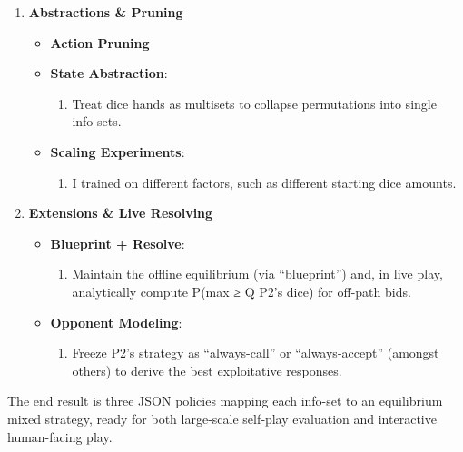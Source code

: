 \documentclass[
]{article}
\begin{document}
\begin{enumerate}
\def\labelenumi{\arabic{enumi}.}
\setcounter{enumi}{4}
\item
  \textbf{Abstractions \& Pruning}

  \begin{itemize}
  \item
    \textbf{Action Pruning}
  \item
    \textbf{State Abstraction}:

    \begin{enumerate}
    \def\labelenumii{\arabic{enumii}.}
    \item
      Treat dice hands as multisets to collapse permutations into single
      info-sets.
    \end{enumerate}
  \item
    \textbf{Scaling Experiments}:

    \begin{enumerate}
    \def\labelenumii{\arabic{enumii}.}
    \item
      I trained on different factors, such as different starting dice
      amounts.
    \end{enumerate}
  \end{itemize}
\item
  \textbf{Extensions \& Live Resolving}

  \begin{itemize}
  \item
    \textbf{Blueprint + Resolve}:

    \begin{enumerate}
    \def\labelenumii{\arabic{enumii}.}
    \item
      Maintain the offline equilibrium (via ``blueprint'') and, in live
      play, analytically compute P(max ≥ Q \textbar{} P2's dice) for
      off-path bids.
    \end{enumerate}
  \item
    \textbf{Opponent Modeling}:

    \begin{enumerate}
    \def\labelenumii{\arabic{enumii}.}
    \item
      Freeze P2's strategy as ``always-call'' or ``always-accept''
      (amongst others) to derive the best exploitative responses.
    \end{enumerate}
  \end{itemize}
\end{enumerate}

The end result is three JSON policies mapping each info-set to an
equilibrium mixed strategy, ready for both large-scale self‑play
evaluation and interactive human-facing play.
\end{document}
